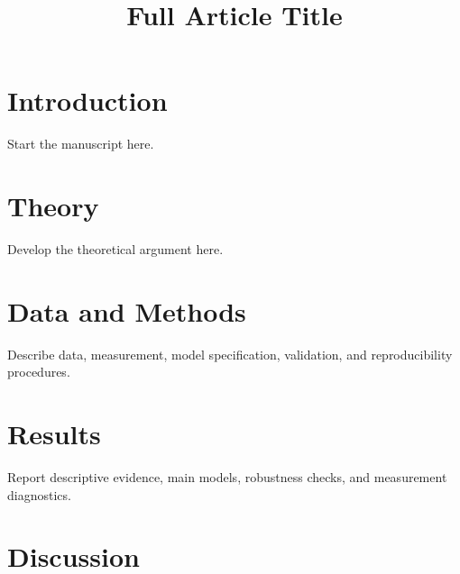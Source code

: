 \documentclass[unnumsec,webpdf,contemporary,large]{oup-authoring-template}
\begin{document}


\title[Short Article Title]{Full Article Title}




\maketitle

\section{Introduction}

Start the manuscript here.

\section{Theory}

Develop the theoretical argument here.

\section{Data and Methods}

Describe data, measurement, model specification, validation, and reproducibility procedures.

\section{Results}

Report descriptive evidence, main models, robustness checks, and measurement diagnostics.

\section{Discussion}
\end{document}
